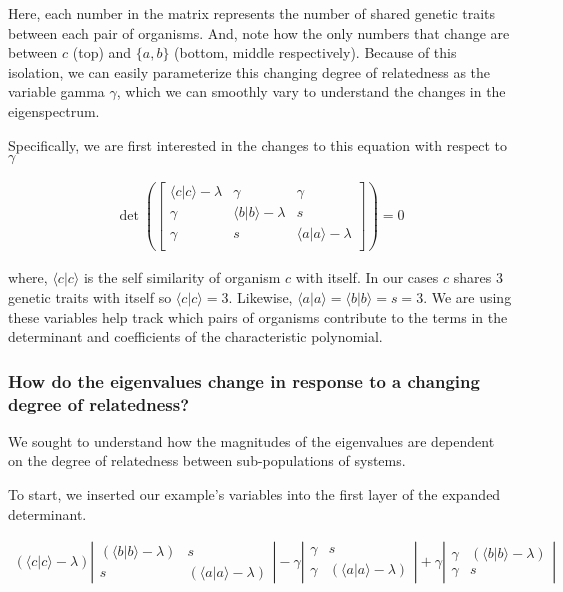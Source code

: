 \documentclass[
  letterpaper,
  DIV=11,
  numbers=noendperiod]{scrartcl}
\begin{document}
Here, each number in the matrix represents the number of shared genetic
traits between each pair of organisms. And, note how the only numbers
that change are between \(c\) (top) and \(\{a, b\}\) (bottom, middle
respectively). Because of this isolation, we can easily parameterize
this changing degree of relatedness as the variable gamma \(\gamma\),
which we can smoothly vary to understand the changes in the
eigenspectrum.

Specifically, we are first interested in the changes to this equation
with respect to \(\gamma\)

\begin{align*}
\det\left(\begin{bmatrix}
    \langle c|c \rangle-\lambda&\gamma&\gamma\\
    \gamma&\langle b|b \rangle-\lambda&s\\
    \gamma&s&\langle a|a \rangle-\lambda\\
    \end{bmatrix}\right) = 0
\end{align*}

where, \(\langle c|c \rangle\) is the self similarity of organism \(c\)
with itself. In our cases \(c\) shares \(3\) genetic traits with itself
so \(\langle c|c \rangle = 3\). Likewise,
\(\langle a|a\rangle = \langle b|b\rangle = s = 3\). We are using these
variables help track which pairs of organisms contribute to the terms in
the determinant and coefficients of the characteristic polynomial.

\hypertarget{how-do-the-eigenvalues-change-in-response-to-a-changing-degree-of-relatedness}{%
\subsubsection{How do the eigenvalues change in response to a changing
degree of
relatedness?}\label{how-do-the-eigenvalues-change-in-response-to-a-changing-degree-of-relatedness}}

We sought to understand how the magnitudes of the eigenvalues are
dependent on the degree of relatedness between sub-populations of
systems.

To start, we inserted our example's variables into the first layer of
the expanded determinant.

\begin{align*}
(\langle c|c \rangle-\lambda)\left|\begin{array}{cc}(\langle b|b \rangle- \lambda)&s\\ s&(\langle a|a \rangle-\lambda)\end{array}\right| -
    \gamma\left|\begin{array}{cc}\gamma&s\\\gamma&(\langle a|a \rangle-\lambda)\end{array}\right| +
    \gamma\left|\begin{array}{cc}\gamma&(\langle b|b \rangle-\lambda)\\\gamma&s\end{array}\right|
\end{align*}
\end{document}
